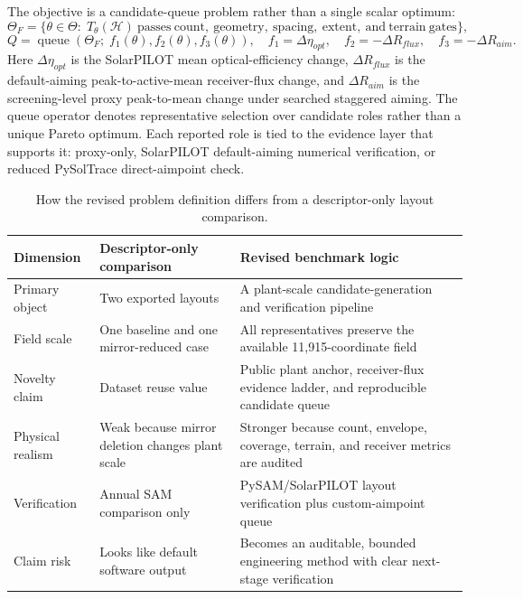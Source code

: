 \documentclass[final,3p,times]{elsarticle}
\begin{document}
The objective is a candidate-queue problem rather than a single scalar optimum:
\begin{equation}
\Theta_F=\{\theta\in\Theta:\;T_\theta(\mathcal{H})\ \mathrm{passes\ count,\ geometry,\ spacing,\ extent,\ and\ terrain\ gates}\},
\end{equation}
\begin{equation}
Q=\operatorname{queue}\left(\Theta_F;\; f_1(\theta), f_2(\theta), f_3(\theta)\right),
\quad
f_1=\Delta \eta_{opt},\quad
f_2=-\Delta R_{flux},\quad
f_3=-\Delta R_{aim}.
\end{equation}
Here $\Delta \eta_{opt}$ is the SolarPILOT mean optical-efficiency change, $\Delta R_{flux}$ is the default-aiming peak-to-active-mean receiver-flux change, and $\Delta R_{aim}$ is the screening-level proxy peak-to-mean change under searched staggered aiming. The queue operator denotes representative selection over candidate roles rather than a unique Pareto optimum. Each reported role is tied to the evidence layer that supports it: proxy-only, SolarPILOT default-aiming numerical verification, or reduced PySolTrace direct-aimpoint check.

\begin{table}[t]
\centering
\caption{How the revised problem definition differs from a descriptor-only layout comparison.}
\label{tab:reframe}
\small
\begin{tabular}{p{}p{}p{}}
\toprule
Dimension & Descriptor-only comparison & Revised benchmark logic \\
\midrule
Primary object & Two exported layouts & A plant-scale candidate-generation and verification pipeline \\
Field scale & One baseline and one mirror-reduced case & All representatives preserve the available 11,915-coordinate field \\
Novelty claim & Dataset reuse value & Public plant anchor, receiver-flux evidence ladder, and reproducible candidate queue \\
Physical realism & Weak because mirror deletion changes plant scale & Stronger because count, envelope, coverage, terrain, and receiver metrics are audited \\
Verification & Annual SAM comparison only & PySAM/SolarPILOT layout verification plus custom-aimpoint queue \\
Claim risk & Looks like default software output & Becomes an auditable, bounded engineering method with clear next-stage verification \\
\bottomrule
\end{tabular}
\end{table}
\end{document}
